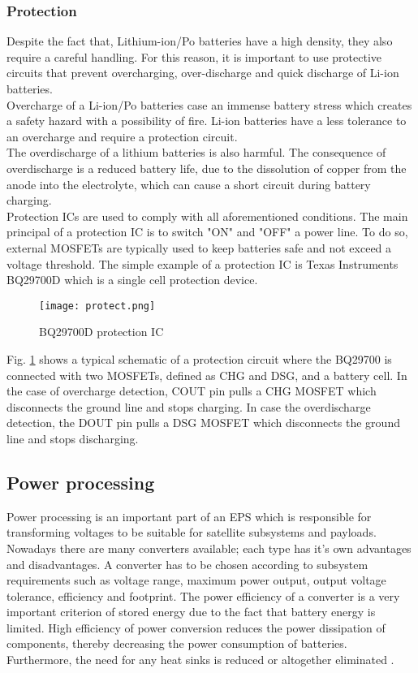 \subsubsection{Protection}

Despite the fact that, Lithium-ion/Po batteries have a high density, they also require a careful handling. For this reason, it is important to use protective circuits that prevent overcharging, over-discharge and quick discharge of Li-ion batteries.\\
\cite{16} Overcharge of a Li-ion/Po batteries case an immense battery stress which creates a safety hazard with a possibility of fire. Li-ion batteries have a less tolerance to an overcharge and require a protection circuit.\\
The overdischarge of a lithium batteries is also harmful. The consequence of overdischarge is a reduced battery life, due to the dissolution of copper from the anode into the electrolyte, which can cause a short circuit during battery charging.\\
Protection ICs are used to comply with all aforementioned conditions. The main principal of a protection IC is to switch "ON" and "OFF" a power line. To do so, external MOSFETs are typically used to keep batteries safe and not exceed a voltage threshold. The simple example of a protection IC is Texas Instruments BQ29700D which is a single cell protection device. 

\begin{figure}[h]
	\centering
	\texttt{[image: protect.png]}
	\caption{ BQ29700D protection IC \cite{17}}
	\label{fig: EPS1}
\end{figure}

Fig. \ref{fig: EPS1} shows a typical schematic of a protection circuit where the BQ29700 is connected with two MOSFETs, defined as CHG and DSG, and a battery cell. In the case of overcharge detection, COUT pin pulls a CHG MOSFET which disconnects the ground line and stops charging. In case the overdischarge detection, the DOUT pin pulls a DSG MOSFET which disconnects the ground line and stops discharging.

\subsection{Power processing \label{sec:tech}}

Power processing is an important part of an EPS which is responsible for transforming voltages to be suitable for satellite subsystems and payloads. Nowadays there are many converters available; each type has it's own advantages and disadvantages. A converter has to be chosen according to subsystem requirements such as voltage range, maximum power output, output voltage tolerance, efficiency and footprint. The power efficiency of a converter is a very important criterion of stored energy due to the fact that battery energy is limited. High efficiency of  power conversion reduces the power dissipation of  components, thereby decreasing the power consumption of batteries. Furthermore, the need for any heat sinks is reduced or altogether eliminated \cite{18}. 


